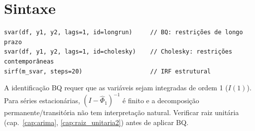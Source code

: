 \section{Sintaxe}

\begin{lstlisting}
svar(df, y1, y2, lags=1, id=longrun)     // BQ: restrições de longo prazo
svar(df, y1, y2, lags=1, id=cholesky)    // Cholesky: restrições contemporâneas
sirf(m_svar, steps=20)                   // IRF estrutural
\end{lstlisting}

\begin{nota}
  A identificação BQ requer que as variáveis sejam integradas de ordem 1
  ($I(1)$). Para séries estacionárias, $(I - \hat{\Phi}_1)^{-1}$ é finito e
  a decomposição permanente/transitória não tem interpretação natural.
  Verificar raiz unitária (cap.~\ref{cap:arima}, \ref{cap:raiz_unitaria2})
  antes de aplicar BQ.
\end{nota}
